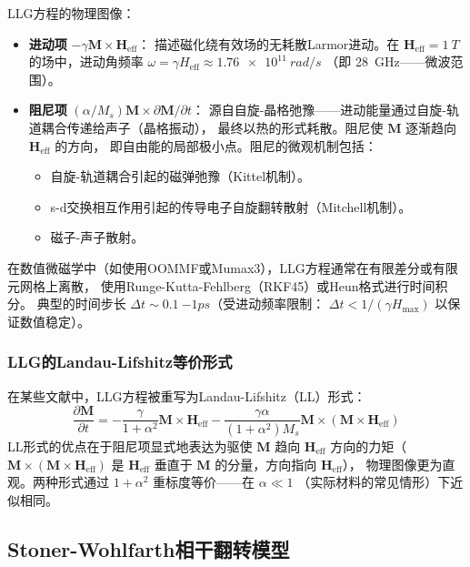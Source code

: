 \documentclass[11pt,a4paper,twoside]{article}
\theoremstyle{definition}
\theoremstyle{plain}
\theoremstyle{remark}
\begin{document}
LLG方程的物理图像：
\begin{itemize}
  \item \textbf{进动项} $-\gamma \mathbf{M} \times \mathbf{H}_{\text{eff}}$：
  描述磁化绕有效场的无耗散Larmor进动。在 $\mathbf{H}_{\text{eff}} = \SI{1}{T}$
  的场中，进动角频率 $\omega = \gamma H_{\text{eff}} \approx \SI{1.76e11}{rad/s}$
  （即 \SI{28}{GHz}——微波范围）。
  \item \textbf{阻尼项} $(\alpha/M_s) \mathbf{M} \times \partial \mathbf{M}/\partial t$：
  源自自旋-晶格弛豫——进动能量通过自旋-轨道耦合传递给声子（晶格振动），
  最终以热的形式耗散。阻尼使 $\mathbf{M}$ 逐渐趋向 $\mathbf{H}_{\text{eff}}$ 的方向，
  即自由能的局部极小点。阻尼的微观机制包括：
  \begin{itemize}
    \item 自旋-轨道耦合引起的磁弹弛豫（Kittel机制）。
    \item s-d交换相互作用引起的传导电子自旋翻转散射（Mitchell机制）。
    \item 磁子-声子散射。
  \end{itemize}
\end{itemize}

在数值微磁学中（如使用OOMMF或Mumax3），LLG方程通常在有限差分或有限元网格上离散，
使用Runge-Kutta-Fehlberg（RKF45）或Heun格式进行时间积分。
典型的时间步长 $\Delta t \sim \SI{0.1}{-1}{ps}$（受进动频率限制：
$\Delta t < 1/(\gamma H_{\text{max}})$ 以保证数值稳定）。

\subsubsection{LLG的Landau-Lifshitz等价形式}

在某些文献中，LLG方程被重写为Landau-Lifshitz（LL）形式：
\begin{equation}
  \frac{\partial \mathbf{M}}{\partial t}
  = -\frac{\gamma}{1+\alpha^2} \mathbf{M} \times \mathbf{H}_{\text{eff}}
  - \frac{\gamma\alpha}{(1+\alpha^2) M_s}
    \mathbf{M} \times (\mathbf{M} \times \mathbf{H}_{\text{eff}})
\end{equation}
LL形式的优点在于阻尼项显式地表达为驱使 $\mathbf{M}$ 趋向 $\mathbf{H}_{\text{eff}}$
方向的力矩（$\mathbf{M} \times (\mathbf{M} \times \mathbf{H}_{\text{eff}})$
是 $\mathbf{H}_{\text{eff}}$ 垂直于 $\mathbf{M}$ 的分量，方向指向 $\mathbf{H}_{\text{eff}}$），
物理图像更为直观。两种形式通过 $1+\alpha^2$ 重标度等价——在 $\alpha \ll 1$
（实际材料的常见情形）下近似相同。

\subsection{Stoner-Wohlfarth相干翻转模型}
\label{sec:sw}
\end{document}
